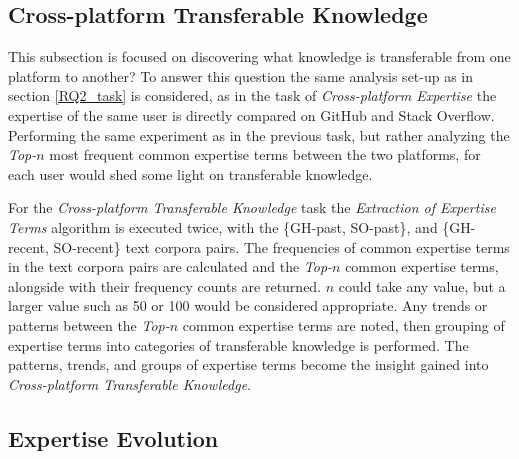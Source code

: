     \subsection{Cross-platform Transferable Knowledge\label{RQ3_task}}
        This subsection is focused on discovering what knowledge is transferable from one platform to another? To answer this question the same analysis set-up as in section \ref{RQ2_task} is considered, as in the task of \emph{Cross-platform Expertise} the expertise of the same user is directly compared on GitHub and Stack Overflow. Performing the same experiment as in the previous task, but rather analyzing the \emph{Top-$n$} most frequent common expertise terms between the two platforms, for each user would shed some light on transferable knowledge.
        
        For the \emph{Cross-platform Transferable Knowledge} task the \emph{Extraction of Expertise Terms} algorithm is executed twice, with the \{GH-past, SO-past\}, and \{GH-recent, SO-recent\} text corpora pairs. The frequencies of common expertise terms in the text corpora pairs are calculated and the \emph{Top-$n$} common expertise terms, alongside with their frequency counts are returned. $n$ could take any value, but a larger value such as 50 or 100 would be considered appropriate. Any trends or patterns between the \emph{Top-$n$} common expertise terms are noted, then grouping of expertise terms into categories of transferable knowledge is performed. The patterns, trends, and groups of expertise terms become the insight gained into \emph{Cross-platform Transferable Knowledge}.
        
    \subsection{Expertise Evolution\label{RQ4_task}}
        

